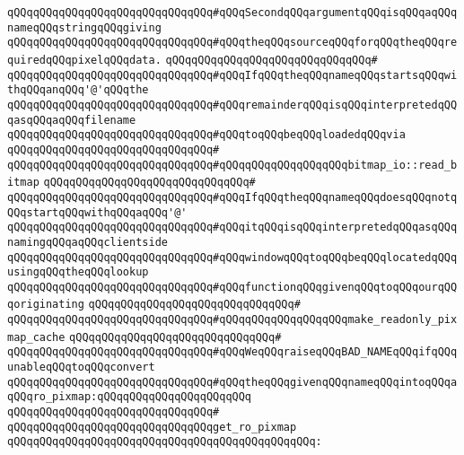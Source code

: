\verb|qQQqqQQqqQQqqQQqqQQqqQQqqQQqqQQq#qQQqSecondqQQqargumentqQQqisqQQqaqQQqnameqQQqstringqQQqgiving|\newline
\verb|qQQqqQQqqQQqqQQqqQQqqQQqqQQqqQQq#qQQqtheqQQqsourceqQQqforqQQqtheqQQqrequiredqQQqpixelqQQqdata.|\newline
\verb|qQQqqQQqqQQqqQQqqQQqqQQqqQQqqQQq#|\newline
\verb|qQQqqQQqqQQqqQQqqQQqqQQqqQQqqQQq#qQQqIfqQQqtheqQQqnameqQQqstartsqQQqwithqQQqanqQQq'@'qQQqthe|\newline
\verb|qQQqqQQqqQQqqQQqqQQqqQQqqQQqqQQq#qQQqremainderqQQqisqQQqinterpretedqQQqasqQQqaqQQqfilename|\newline
\verb|qQQqqQQqqQQqqQQqqQQqqQQqqQQqqQQq#qQQqtoqQQqbeqQQqloadedqQQqvia|\newline
\verb|qQQqqQQqqQQqqQQqqQQqqQQqqQQqqQQq#|\newline
\verb|qQQqqQQqqQQqqQQqqQQqqQQqqQQqqQQq#qQQqqQQqqQQqqQQqqQQqbitmap_io::read_bitmap|\newline
\verb|qQQqqQQqqQQqqQQqqQQqqQQqqQQqqQQq#|\newline
\verb|qQQqqQQqqQQqqQQqqQQqqQQqqQQqqQQq#qQQqIfqQQqtheqQQqnameqQQqdoesqQQqnotqQQqstartqQQqwithqQQqaqQQq'@'|\newline
\verb|qQQqqQQqqQQqqQQqqQQqqQQqqQQqqQQq#qQQqitqQQqisqQQqinterpretedqQQqasqQQqnamingqQQqaqQQqclientside|\newline
\verb|qQQqqQQqqQQqqQQqqQQqqQQqqQQqqQQq#qQQqwindowqQQqtoqQQqbeqQQqlocatedqQQqusingqQQqtheqQQqlookup|\newline
\verb|qQQqqQQqqQQqqQQqqQQqqQQqqQQqqQQq#qQQqfunctionqQQqgivenqQQqtoqQQqourqQQqoriginating|\newline
\verb|qQQqqQQqqQQqqQQqqQQqqQQqqQQqqQQq#|\newline
\verb|qQQqqQQqqQQqqQQqqQQqqQQqqQQqqQQq#qQQqqQQqqQQqqQQqqQQqmake_readonly_pixmap_cache|\newline
\verb|qQQqqQQqqQQqqQQqqQQqqQQqqQQqqQQq#|\newline
\verb|qQQqqQQqqQQqqQQqqQQqqQQqqQQqqQQq#qQQqWeqQQqraiseqQQqBAD_NAMEqQQqifqQQqunableqQQqtoqQQqconvert|\newline
\verb|qQQqqQQqqQQqqQQqqQQqqQQqqQQqqQQq#qQQqtheqQQqgivenqQQqnameqQQqintoqQQqaqQQqro_pixmap:qQQqqQQqqQQqqQQqqQQqqQQq|\newline
\verb|qQQqqQQqqQQqqQQqqQQqqQQqqQQqqQQq#|\newline
\verb|qQQqqQQqqQQqqQQqqQQqqQQqqQQqqQQqget_ro_pixmap|\newline
\verb|qQQqqQQqqQQqqQQqqQQqqQQqqQQqqQQqqQQqqQQqqQQqqQQq:|\newline
